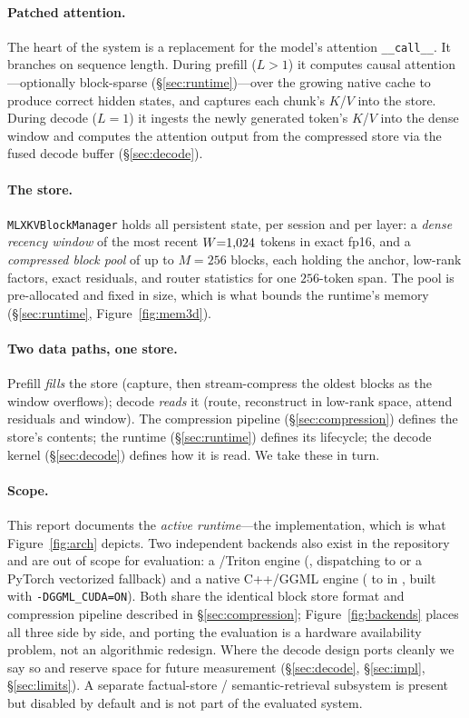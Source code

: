 \paragraph{Patched attention.} The heart of the system is a replacement for the model's attention
\texttt{\_\_call\_\_}. It branches on sequence length. During prefill ($L{>}1$) it computes causal
attention---optionally block-sparse (\S\ref{sec:runtime})---over the growing native cache to
produce correct hidden states, and captures each chunk's $K$/$V$ into the store. During decode
($L{=}1$) it ingests the newly generated token's $K$/$V$ into the dense window and computes the
attention output from the compressed store via the fused decode buffer (\S\ref{sec:decode}).

\paragraph{The store.} \texttt{MLXKVBlockManager} holds all persistent state, per session and per
layer: a \emph{dense recency window} of the most recent $W{=}1{,}024$ tokens in exact
fp16, and a \emph{compressed block pool} of up to $M{=}256$ blocks, each holding the anchor,
low-rank factors, exact residuals, and router statistics for one $256$-token span. The pool is
pre-allocated and fixed in size, which is what bounds the runtime's memory
(\S\ref{sec:runtime}, Figure~\ref{fig:mem3d}).

\paragraph{Two data paths, one store.} Prefill \emph{fills} the store (capture, then stream-compress
the oldest blocks as the window overflows); decode \emph{reads} it (route, reconstruct in
low-rank space, attend residuals and window). The compression pipeline (\S\ref{sec:compression})
defines the store's contents; the runtime (\S\ref{sec:runtime}) defines its lifecycle; the decode
kernel (\S\ref{sec:decode}) defines how it is read. We take these in turn.

\paragraph{Scope.} This report documents the \emph{active runtime}---the \mlxe{} implementation,
which is what Figure~\ref{fig:arch} depicts. Two independent backends also exist in the
repository and are out of scope for evaluation:
a \cuda{}/Triton engine (, dispatching to
 or a PyTorch vectorized fallback) and a native C++/GGML engine
( to  in ,
built with \texttt{-DGGML\_CUDA=ON}). Both share the identical block store format and compression
pipeline described in \S\ref{sec:compression}; Figure~\ref{fig:backends} places all three
side by side, and porting the evaluation is a hardware availability
problem, not an algorithmic redesign. Where the decode design ports cleanly we say so and reserve
space for future measurement (\S\ref{sec:decode}, \S\ref{sec:impl}, \S\ref{sec:limits}).
A separate factual-store / semantic-retrieval subsystem is present but disabled by default and
is not part of the evaluated system.
